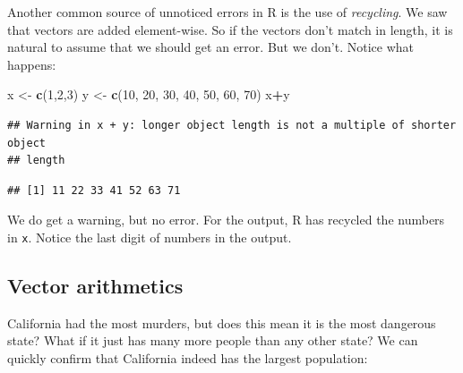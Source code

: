 \documentclass[
]{article}
\newenvironment{Shaded}{\begin{snugshade}}{\end{snugshade}}
\newcommand{\DecValTok}[1]{\textcolor[rgb]{0.00,0.00,0.81}{#1}}
\newcommand{\FunctionTok}[1]{\textcolor[rgb]{0.13,0.29,0.53}{\textbf{#1}}}
\newcommand{\NormalTok}[1]{#1}
\newcommand{\OtherTok}[1]{\textcolor[rgb]{0.56,0.35,0.01}{#1}}
\newcommand{\SpecialCharTok}[1]{\textcolor[rgb]{0.81,0.36,0.00}{\textbf{#1}}}
\newcommand{\StringTok}[1]{\textcolor[rgb]{0.31,0.60,0.02}{#1}}
\begin{document}
Another common source of unnoticed errors in R is the use of
\emph{recycling}. We saw that vectors are added element-wise. So if the
vectors don't match in length, it is natural to assume that we should
get an error. But we don't. Notice what happens:

\begin{Shaded}
\begin{Highlighting}[]
\NormalTok{x }\OtherTok{\textless{}{-}} \FunctionTok{c}\NormalTok{(}\DecValTok{1}\NormalTok{,}\DecValTok{2}\NormalTok{,}\DecValTok{3}\NormalTok{)}
\NormalTok{y }\OtherTok{\textless{}{-}} \FunctionTok{c}\NormalTok{(}\DecValTok{10}\NormalTok{, }\DecValTok{20}\NormalTok{, }\DecValTok{30}\NormalTok{, }\DecValTok{40}\NormalTok{, }\DecValTok{50}\NormalTok{, }\DecValTok{60}\NormalTok{, }\DecValTok{70}\NormalTok{)}
\NormalTok{x}\SpecialCharTok{+}\NormalTok{y}
\end{Highlighting}
\end{Shaded}

\begin{verbatim}
## Warning in x + y: longer object length is not a multiple of shorter object
## length
\end{verbatim}

\begin{verbatim}
## [1] 11 22 33 41 52 63 71
\end{verbatim}

We do get a warning, but no error. For the output, R has recycled the
numbers in \texttt{x}. Notice the last digit of numbers in the output.

\subsection{Vector arithmetics}\label{vector-arithmetics}

California had the most murders, but does this mean it is the most
dangerous state? What if it just has many more people than any other
state? We can quickly confirm that California indeed has the largest
population:

\begin{Shaded}
\end{Shaded}
\end{document}
